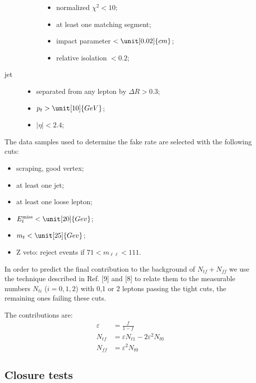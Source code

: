\begin{description}
\begin{description}
\begin{itemize}
                    \item normalized $\chi^2 < 10$;
                    \item at least one matching segment;
                    \item impact parameter $< \unit[0.02]{cm}$;
                    \item relative isolation $< 0.2$;
                \end{itemize}
        \end{description}
    \item[jet] 
        \begin{itemize}
            \item separated from any lepton by $\Delta R > 0.3$;
            \item $p_t > \unit[10]{GeV}$;
            \item $\lvert \eta \rvert < 2.4$;
        \end{itemize}
\end{description}

The data samples used to determine the fake rate are selected with the following cuts:
\begin{itemize}
    \item scraping, good vertex;
    \item at least one jet;
    \item at least one loose lepton;
    \item $E_t^{\text{miss}} < \unit[20]{Gev}$;
    \item $m_t < \unit[25]{Gev}$;
    \item $\mathrm{Z}$ veto: reject events if $71 < m_{\ell \ell} < 111$.
\end{itemize}

In order to predict the final contribution to the background of
$N_{tf} + N_{ff}$ we use the technique described in
Ref. [9] and [8] to relate them to the measurable numbers $N_{ti}$
($i = 0,1,2$) with 0,1 or 2 leptons passing the tight cuts, the remaining
ones failing these cuts.

The contributions are:
\begin{align*}
    \varepsilon &= \frac{f}{1 - f}\\
N_{tf} &= \varepsilon N_{t1} - 2 \varepsilon^2 N_{t0}\\
N_{ff} &= \varepsilon^2 N_{t0}
\end{align*}
    
\subsection{Closure tests}
